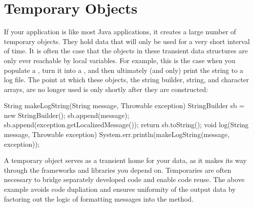 
\section{Temporary Objects}
\label{sec:temporary-lifetime}

If your application is like most Java applications, it creates a large number of
temporary objects. They hold data that will only be used for a very short
interval of time. It is often the case that the objects in these transient data
structures are only ever reachable by local variables. For example, this is the
case when you populate a , turn it into a ,
and then ultimately (and only) print the string to a log file. The point at
which these objects, the string builder, string, and character arrays, are no
longer used is only shortly after they are constructed:

\begin{shortlisting}
String makeLogString(String message, Throwable exception) {
	StringBuilder sb = new StringBuilder();
	sb.append(message);
	sb.append(exception.getLocalizedMessage());
	return sb.toString();
}
void log(String message, Throwable exception) {
	System.err.println(makeLogString(message, exception));
}
\end{shortlisting}

A temporary object serves as a transient home for your data, as it makes its way
through the frameworks and libraries you depend on. Temporaries are often
necessary to bridge separately developed code and enable code reuse. The above
example avoids code dupliation and ensures uniformity of the output data by
factoring out the logic of formatting messages into the 
method.

